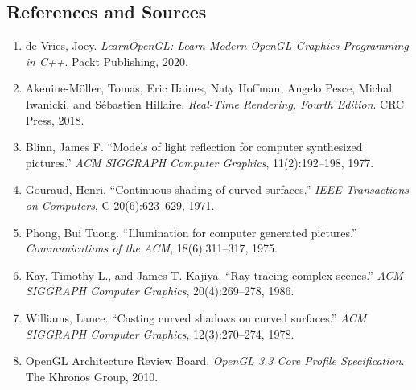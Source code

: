 \documentclass[11pt,a4paper]{article}
\begin{document}
\subsection{References and Sources}
\begin{enumerate}[itemsep=2pt,topsep=2pt]
  \item de Vries, Joey. \emph{LearnOpenGL: Learn Modern OpenGL Graphics Programming in C++}. Packt Publishing, 2020.
  \item Akenine-Möller, Tomas, Eric Haines, Naty Hoffman, Angelo Pesce, Michal Iwanicki, and Sébastien Hillaire. \emph{Real-Time Rendering, Fourth Edition}. CRC Press, 2018.
  \item Blinn, James F. ``Models of light reflection for computer synthesized pictures.'' \emph{ACM SIGGRAPH Computer Graphics}, 11(2):192--198, 1977.
  \item Gouraud, Henri. ``Continuous shading of curved surfaces.'' \emph{IEEE Transactions on Computers}, C-20(6):623--629, 1971.
  \item Phong, Bui Tuong. ``Illumination for computer generated pictures.'' \emph{Communications of the ACM}, 18(6):311--317, 1975.
  \item Kay, Timothy L., and James T. Kajiya. ``Ray tracing complex scenes.'' \emph{ACM SIGGRAPH Computer Graphics}, 20(4):269--278, 1986.
  \item Williams, Lance. ``Casting curved shadows on curved surfaces.'' \emph{ACM SIGGRAPH Computer Graphics}, 12(3):270--274, 1978.
  \item OpenGL Architecture Review Board. \emph{OpenGL 3.3 Core Profile Specification}. The Khronos Group, 2010.
\end{enumerate}
\end{document}
